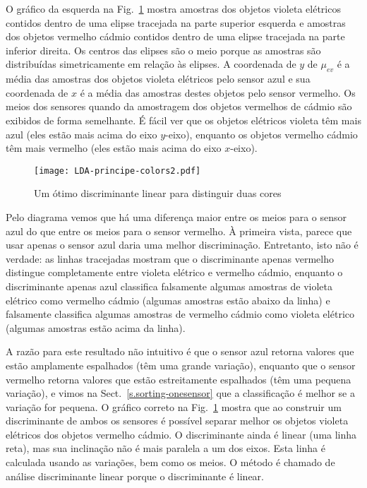O gráfico da esquerda na Fig.~\ref{fig.LDAprincipe} mostra amostras dos objetos violeta elétricos contidos dentro de uma elipse tracejada na parte superior esquerda e amostras dos objetos vermelho cádmio contidos dentro de uma elipse tracejada na parte inferior direita. Os centros das elipses são o meio porque as amostras são distribuídas simetricamente em relação às elipses. A coordenada de $y$ de $\mu_{ev}$ é a média das amostras dos objetos violeta elétricos pelo sensor azul e sua coordenada de $x$ é a média das amostras destes objetos pelo sensor vermelho. Os meios dos sensores quando da amostragem dos objetos vermelhos de cádmio são exibidos de forma semelhante. É fácil ver que os objetos elétricos violeta têm mais azul (eles estão mais acima do eixo $y$-eixo), enquanto os objetos vermelho cádmio têm mais vermelho (eles estão mais acima do eixo $x$-eixo).

\begin{figure}
\begin{center}
\texttt{[image: LDA-principe-colors2.pdf]}
\end{center}
\caption{Um ótimo discriminante linear para distinguir duas cores}\label{fig.LDAprincipe}
\end{figure}

Pelo diagrama vemos que há uma diferença maior entre os meios para o sensor azul do que entre os meios para o sensor vermelho. À primeira vista, parece que usar apenas o sensor azul daria uma melhor discriminação. Entretanto, isto não é verdade: as linhas tracejadas mostram que o discriminante apenas vermelho distingue completamente entre violeta elétrico e vermelho cádmio, enquanto o discriminante apenas azul classifica falsamente algumas amostras de violeta elétrico como vermelho cádmio (algumas amostras estão abaixo da linha) e falsamente classifica algumas amostras de vermelho cádmio como violeta elétrico (algumas amostras estão acima da linha).

A razão para este resultado não intuitivo é que o sensor azul retorna valores que estão amplamente espalhados (têm uma grande variação), enquanto que o sensor vermelho retorna valores que estão estreitamente espalhados (têm uma pequena variação), e vimos na Sect.~\ref{s.sorting-onesensor} que a classificação é melhor se a variação for pequena. O gráfico correto na Fig.~\ref{fig.LDAprincipe} mostra que ao construir um discriminante de ambos os sensores é possível separar melhor os objetos violeta elétricos dos objetos vermelho cádmio. O discriminante ainda é linear (uma linha reta), mas sua inclinação não é mais paralela a um dos eixos. Esta linha é calculada usando as variações, bem como os meios. O método é chamado de análise discriminante linear porque o discriminante é linear.

